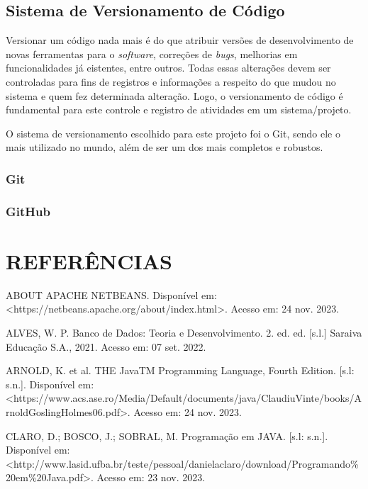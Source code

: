\documentclass[a4paper,12pt]{article}
\begin{document}
\subsection{Sistema de Versionamento de Código}
Versionar um código nada mais é do que atribuir versões de desenvolvimento de novas ferramentas para o \textit{software}, correções de \textit{bugs}, 
melhorias em funcionalidades já eistentes, entre outros. Todas essas alterações devem ser controladas para fins de registros e informações a respeito do que mudou 
no sistema e quem fez determinada alteração. Logo, o versionamento de código é fundamental para este controle e registro de atividades em um sistema/projeto.

O sistema de versionamento escolhido para este projeto foi o Git, sendo ele o mais utilizado no mundo, além de ser um dos mais completos e robustos.
\subsubsection{Git}
\subsubsection{GitHub}


\pagebreak
\centering \section*{REFERÊNCIAS}
\vspace{1cm}

\raggedright
\noindent ABOUT APACHE NETBEANS. Disponível em: <https://netbeans.apache.org/about/index.html>. Acesso em: 24 nov. 2023. \linebreak

\noindent ALVES, W. P. Banco de Dados: Teoria e Desenvolvimento. 2. ed. ed. [s.l.] Saraiva Educação S.A., 2021. Acesso em: 07 set. 2022. \linebreak 

\noindent ARNOLD, K. et al. THE JavaTM Programming Language, Fourth Edition. [s.l: s.n.]. 
Disponível em: <https://www.acs.ase.ro/Media/Default/documents/java/ClaudiuVinte/books/ArnoldGoslingHolmes06.pdf>. 
Acesso em: 24 nov. 2023. \linebreak

\noindent CLARO, D.; BOSCO, J.; SOBRAL, M. Programação em JAVA. [s.l: s.n.]. 
Disponível em: <http://www.lasid.ufba.br/teste/pessoal/danielaclaro/download/Programando\%20em\%20Java.pdf>. 
Acesso em: 23 nov. 2023. \linebreak
\end{document}
